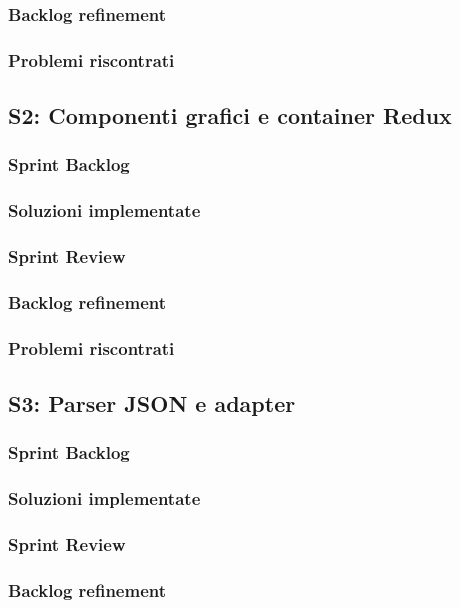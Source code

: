 \subsubsection{Backlog refinement}
\subsubsection{Problemi riscontrati}

\subsection{S2: Componenti grafici e container Redux}
\subsubsection{Sprint Backlog}
\subsubsection{Soluzioni implementate}
\subsubsection{Sprint Review}
\subsubsection{Backlog refinement}
\subsubsection{Problemi riscontrati}

\subsection{S3: Parser JSON e adapter}
\subsubsection{Sprint Backlog}
\subsubsection{Soluzioni implementate}
\subsubsection{Sprint Review}
\subsubsection{Backlog refinement}
